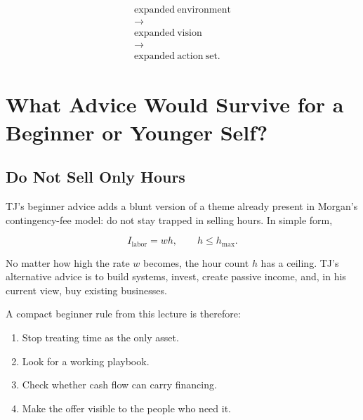 \documentclass[11pt,oneside]{book}
\begin{document}
\begin{equation}
\begin{gathered}
\mathrm{expanded\ environment}\\
\longrightarrow\\
\mathrm{expanded\ vision}\\
\longrightarrow\\
\mathrm{expanded\ action\ set}.
\end{gathered}
\end{equation}

\chapter{What Advice Would Survive for a Beginner or Younger Self?}

\section{Do Not Sell Only Hours}

TJ's beginner advice adds a blunt version of a theme already present in Morgan's contingency-fee model: do not stay trapped in selling hours. In simple form,

\begin{equation}
I_{\mathrm{labor}}=wh,
\qquad
h\leq h_{\max}.
\end{equation}

No matter how high the rate \(w\) becomes, the hour count \(h\) has a ceiling. TJ's alternative advice is to build systems, invest, create passive income, and, in his current view, buy existing businesses.

A compact beginner rule from this lecture is therefore:

\begin{enumerate}
\item Stop treating time as the only asset.
\item Look for a working playbook.
\item Check whether cash flow can carry financing.
\item Make the offer visible to the people who need it.
\end{enumerate}

\end{document}
